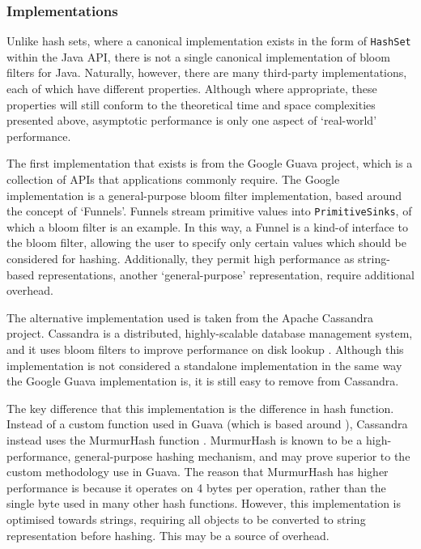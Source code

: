 	\subsubsection{Implementations} \label{sec:runtime/storage/probabilistic/impls}
	Unlike hash sets, where a canonical implementation exists in the form of \texttt{HashSet} within the Java API, there is not a single canonical implementation of bloom filters for Java. Naturally, however, there are many third-party implementations, each of which have different properties. Although where appropriate, these properties will still conform to the theoretical time and space complexities presented above, asymptotic performance is only one aspect of `real-world' performance.
	
	The first implementation that exists is from the Google Guava project, which is a collection of APIs that applications commonly require. The Google implementation is a general-purpose bloom filter implementation, based around the concept of `Funnels'. Funnels stream primitive values into \texttt{PrimitiveSinks}, of which a bloom filter is an example. In this way, a Funnel is a kind-of interface to the bloom filter, allowing the user to specify only certain values which should be considered for hashing. Additionally, they permit high performance as string-based representations, another `general-purpose' representation, require additional overhead.
	
	The alternative implementation used is taken from the Apache Cassandra project. Cassandra is a distributed, highly-scalable database management system, and it uses bloom filters to improve performance on disk lookup \citep{CassandraArch}. Although this implementation is not considered a standalone implementation in the same way the Google Guava implementation is, it is still easy to remove from Cassandra.
	
	The key difference that this implementation is the difference in hash function. Instead of a custom function used in Guava (which is based around \citet{Swamidass2007}), Cassandra instead uses the MurmurHash function \citep{MurmurHash}. MurmurHash is known to be a high-performance, general-purpose hashing mechanism, and may prove superior to the custom methodology use in Guava. The reason that MurmurHash has higher performance is because it operates on 4 bytes per operation, rather than the single byte used in many other hash functions. However, this implementation is optimised towards strings, requiring all objects to be converted to string representation before hashing. This may be a source of overhead.
	
